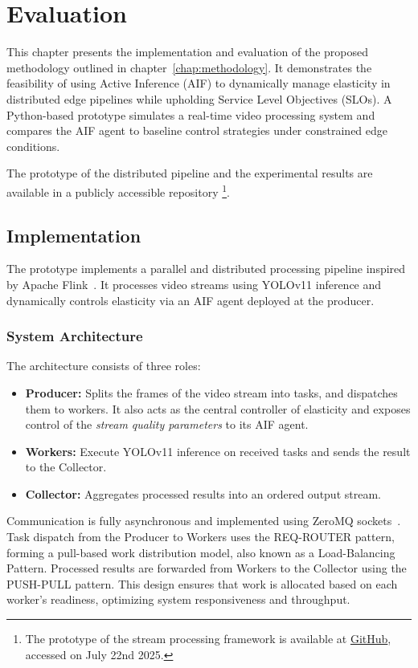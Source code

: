 \chapter{Evaluation}
This chapter presents the implementation and evaluation of the proposed methodology outlined
in chapter~\ref{chap:methodology}. It demonstrates the feasibility of using Active Inference (AIF) to dynamically manage elasticity in distributed edge pipelines while upholding Service Level Objectives (SLOs). A Python-based prototype simulates a real-time video processing system and compares the AIF agent to baseline control strategies under constrained edge conditions.

The prototype of the distributed pipeline and the experimental results are available in a publicly accessible repository \footnote{The prototype of the stream processing framework is available at \href{https://github.com/JohnnyElaine/bsc_aif_parallel_pipeline}{GitHub}, accessed on July 22nd 2025.}.

\section{Implementation}
\label{sec:implementation}
The prototype implements a parallel and distributed processing pipeline inspired by Apache Flink~\cite{carbone_apache_2015}. It processes video streams using YOLOv11 inference and dynamically controls elasticity via an AIF agent deployed at the producer.

\subsection{System Architecture}
The architecture consists of three roles:
\begin{itemize}
    \item \textbf{Producer:} Splits the frames of the video stream into tasks, and dispatches them to workers. It also acts as the central controller of elasticity and exposes control of the \textit{stream quality parameters} to its AIF agent.
    \item \textbf{Workers:} Execute YOLOv11 inference on received tasks and sends the result to the Collector.
    \item \textbf{Collector:} Aggregates processed results into an ordered output stream.
\end{itemize}

Communication is fully asynchronous and implemented using ZeroMQ sockets~\cite{noauthor_zeromqpyzmq_nodate}. Task dispatch from the Producer to Workers uses the REQ-ROUTER pattern, forming a pull-based work distribution model, also known as a Load-Balancing Pattern. Processed results are forwarded from Workers to the Collector using the PUSH-PULL pattern. This design ensures that work is allocated based on each worker’s readiness, optimizing system responsiveness and throughput.

